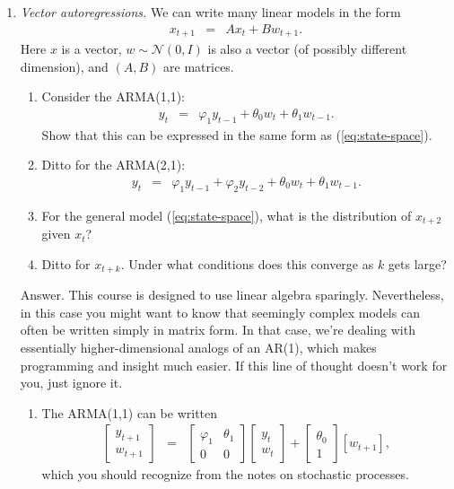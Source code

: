 \documentclass[11pt]{article}
\begin{document}
\begin{enumerate}
\item {\it Vector autoregressions.\/}
We can write many linear models in the form
\begin{eqnarray}
    x_{t+1} &=& A x_t + B w_{t+1} .
    \label{eq:state-space}
\end{eqnarray}
Here $x$ is a vector, $w \sim \mathcal{N}(0,I)$
is also a vector (of possibly different dimension),
and $(A,B)$ are matrices.
%
\begin{enumerate}
\item Consider the ARMA(1,1):
\begin{eqnarray*}
    y_t &=& \varphi_1 y_{t-1} + \theta_0 w_t + \theta_1 w_{t-1} .
\end{eqnarray*}
Show that this can be expressed in the same form as (\ref{eq:state-space}).
\item Ditto for the ARMA(2,1):
\begin{eqnarray*}
    y_t &=& \varphi_1 y_{t-1} + \varphi_2 y_{t-2} + \theta_0 w_t + \theta_1 w_{t-1} .
\end{eqnarray*}
\item For the general model (\ref{eq:state-space}),
what is the distribution of $x_{t+2}$ given $x_t$?
\item Ditto for $x_{t+k}$.
Under what conditions does this converge as $k$ gets large?
\end{enumerate}
%
Answer.
This course is designed to use linear algebra sparingly.
Nevertheless, in this case you might want to know
that seemingly complex models can often
be written simply in matrix form.
In that case, we're dealing with essentially higher-dimensional
analogs of an AR(1), which makes programming and insight much easier.
If this line of thought doesn't work for you, just ignore it.
%
\begin{enumerate}
\item The ARMA(1,1) can be written
\begin{eqnarray*}
    \left[
    \begin{array}{c}
    y_{t+1} \\ w_{t+1}
    \end{array}
    \right]
    &=&
    \left[
    \begin{array}{cc}
    \varphi_1 & \theta_1 \\ 0 & 0
    \end{array}
    \right]
    \left[
    \begin{array}{c}
    y_{t} \\ w_{t}
    \end{array}
    \right]
    +
    \left[
    \begin{array}{c}
    \theta_0 \\ 1
    \end{array}
    \right]
    [w_{t+1} ] ,
\end{eqnarray*}
which you should recognize from the notes on stochastic processes.


\end{enumerate}
\end{enumerate}
\end{document}
